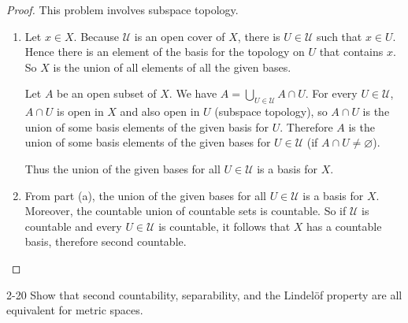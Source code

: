 \begin{proof}
	This problem involves subspace topology.
	\begin{enumerate}[label={(\alph*)}]
		\item Let $x\in X$. Because $\mathscr{U}$ is an open cover of $X$, there is $U\in\mathscr{U}$ such that $x\in U$. Hence there is an element of the basis for the topology on $U$ that contains $x$. So $X$ is the union of all elements of all the given bases.

		      Let $A$ be an open subset of $X$. We have $A = \bigcup_{U\in\mathscr{U}}A\cap U$. For every $U\in\mathscr{U}$, $A\cap U$ is open in $X$ and also open in $U$ (subspace topology), so $A\cap U$ is the union of some basis elements of the given basis for $U$. Therefore $A$ is the union of some basis elements of the given bases for $U\in\mathscr{U}$ (if $A\cap U\ne\varnothing$).

		      Thus the union of the given bases for all $U\in\mathscr{U}$ is a basis for $X$.
		\item From part (a), the union of the given bases for all $U\in\mathscr{U}$ is a basis for $X$. Moreover, the countable union of countable sets is countable. So if $\mathscr{U}$ is countable and every $U\in\mathscr{U}$ is countable, it follows that $X$ has a countable basis, therefore second countable.
	\end{enumerate}
\end{proof}

\begin{problem}{2-20}
Show that second countability, separability, and the Lindelöf property are all equivalent for metric spaces.
\end{problem}

